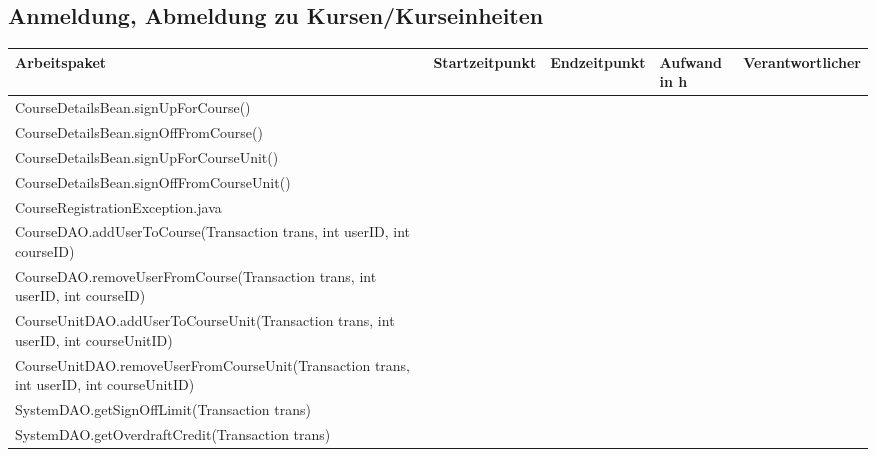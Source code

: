 \begin{landscape}
	\subsection{Anmeldung, Abmeldung zu Kursen/Kurseinheiten}
	\begin{tabular}{|p{10cm}|p{4cm}|p{3cm}|p{3cm}|p{3cm}|}
		\hline  \textbf{Arbeitspaket} & \textbf{Startzeitpunkt} & \textbf{Endzeitpunkt} & \textbf{Aufwand in h} & \textbf{Verantwortlicher} \\ 
		\hline   CourseDetailsBean.signUpForCourse()                          &                            &                             &                     &\\
		\hline   CourseDetailsBean.signOffFromCourse()                        &                            &                             &                     &\\
		\hline   CourseDetailsBean.signUpForCourseUnit()                      &                            &                             &                     &\\
		\hline   CourseDetailsBean.signOffFromCourseUnit()                    &                            &                             &                     &\\
		\hline   CourseRegistrationException.java                             &                            &                             &                     &\\
		\hline   CourseDAO.addUserToCourse(Transaction trans, int userID, int courseID)            &                        &                         &                     &\\
		\hline   CourseDAO.removeUserFromCourse(Transaction trans, int userID, int courseID)       &                        &                         &                     &\\
		\hline   CourseUnitDAO.addUserToCourseUnit(Transaction trans, int userID, int courseUnitID)&                        &                         &                     &\\ 
		\hline   CourseUnitDAO.removeUserFromCourseUnit(Transaction trans, int userID, int courseUnitID) &                            &                             &                     &\\
		\hline   SystemDAO.getSignOffLimit(Transaction trans)                 &                            &                             &                     &\\ 
		\hline   SystemDAO.getOverdraftCredit(Transaction trans)              &                            &                             &                     &\\ 
		\hline 
	\end{tabular} \ \\
	\ \\
	

\end{landscape}
